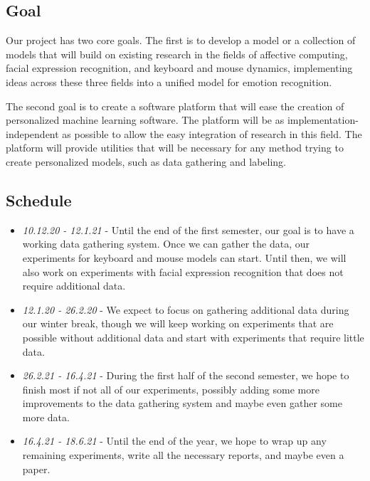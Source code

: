 \documentclass[../main.tex]{subfiles}
\begin{document}
\subsection{Goal}
Our project has two core goals. The first is to develop a model or a collection of models that will build on existing research in
the fields of affective computing, facial expression recognition, and keyboard and mouse dynamics, implementing ideas across these
three fields into a unified model for emotion recognition.

The second goal is to create a software platform that will ease the creation of personalized machine learning software.
The platform will be as implementation-independent as possible to allow the easy integration of research in this field.
The platform will provide utilities that will be necessary for any method trying to create personalized models,
such as data gathering and labeling.


\subsection{Schedule}

\begin{samepage}
\begin{itemize}
    \item \emph{10.12.20 - 12.1.21} - Until the end of the first semester, our goal is to have a working data gathering system.
        Once we can gather the data, our experiments for keyboard and mouse models can start. Until then,
        we will also work on experiments with facial expression recognition that does not require additional data. 
    \item \emph{12.1.20 - 26.2.20} - We expect to focus on gathering additional data during our winter break,
        though we will keep working on experiments that are possible without additional data and start with experiments that require
        little data.
    \item \emph{26.2.21 - 16.4.21} - During the first half of the second semester, we hope to finish most if not all of our experiments,
        possibly adding some more improvements to the data gathering system and maybe even gather some more data. 
    \item \emph{16.4.21 - 18.6.21} - Until the end of the year, we hope to wrap up any remaining experiments, write all the necessary reports,
        and maybe even a paper.
\end{itemize}
\end{samepage}
\end{document}
